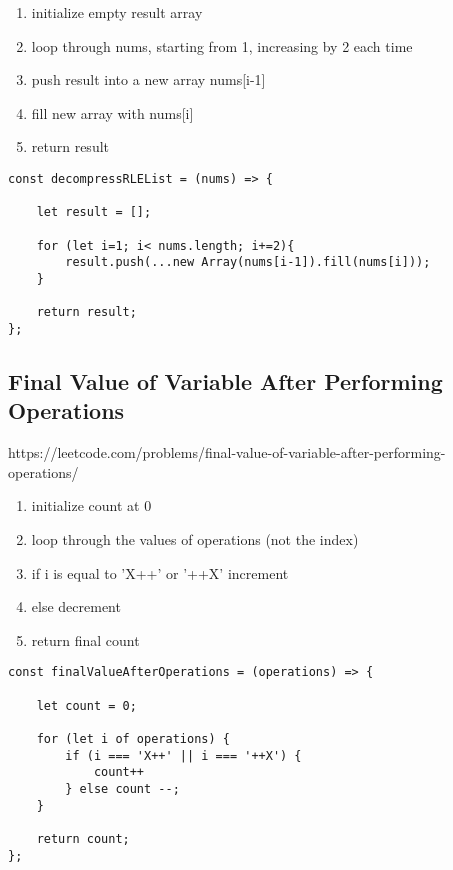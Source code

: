 \documentclass[10pt]{article}
\begin{document}
\begin{enumerate}
	\item initialize empty result array
	\item loop through nums, starting from 1, increasing by 2 each time
	\item push result into a new array nums[i-1]
	\item fill new array with nums[i]
	\item return result 
\end{enumerate}

\begin{lstlisting}[title=Solution decompressRLEList, captionpos=t]
const decompressRLEList = (nums) => {

    let result = [];
    
    for (let i=1; i< nums.length; i+=2){
        result.push(...new Array(nums[i-1]).fill(nums[i]));
    }
    
    return result;
};
\end{lstlisting}
\medskip %



\pagebreak
\medskip %
\subsection{Final Value of Variable After Performing Operations}
https://leetcode.com/problems/final-value-of-variable-after-performing-operations/

\begin{enumerate}
	\item initialize count at 0
	\item loop through the values of operations (not the index)
	\item if i is equal to 'X++' or '++X' increment
	\item else decrement 
	\item return final count
\end{enumerate}

\begin{lstlisting}[title=Solution finalValueAfterOperations, captionpos=t]
const finalValueAfterOperations = (operations) => {

    let count = 0;

    for (let i of operations) {
        if (i === 'X++' || i === '++X') {
            count++
        } else count --;
    }
    
    return count;
};
\end{lstlisting}
\medskip %
\end{document}
